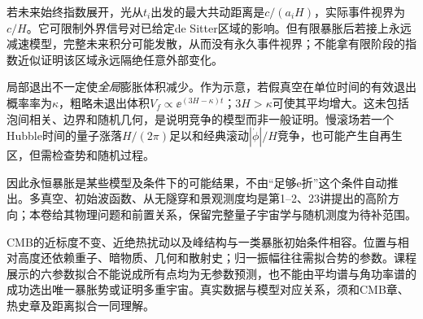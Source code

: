 若未来始终指数展开，光从$t_i$出发的最大共动距离是$c/(a_iH)$，实际事件视界为$c/H$。它可限制外界信号对已给定de Sitter区域的影响。但有限暴胀后若接上永远减速模型，完整未来积分可能发散，从而没有永久事件视界；不能拿有限阶段的指数近似证明该区域永远隔绝任意外部变化。

局部退出不一定使\emph{全局}膨胀体积减少。作为示意，若假真空在单位时间的有效退出概率率为$\kappa$，粗略未退出体积$V_f\propto\ee^{(3H-\kappa)t}$；$3H>\kappa$可使其平均增大。这未包括泡间相关、边界和随机几何，是说明竞争的模型而非一般证明。慢滚场若一个Hubble时间的量子涨落$H/(2\pi)$足以和经典滚动$|\dot\phi|/H$竞争，也可能产生自再生区，但需检查势和随机过程。

因此永恒暴胀是某些模型及条件下的可能结果，不由“足够e折”这个条件自动推出。多真空、初始波函数、从无隧穿和景观测度均是第1--2、23讲提出的高阶方向；本卷给其物理问题和前置关系，保留完整量子宇宙学与随机测度为待补范围。

CMB的近标度不变、近绝热扰动以及峰结构与一类暴胀初始条件相容。位置与相对高度还依赖重子、暗物质、几何和散射史；归一振幅往往需拟合势的参数。课程展示的六参数拟合不能说成所有点均为无参数预测，也不能由平均谱与角功率谱的成功选出唯一暴胀势或证明多重宇宙。真实数据与模型对应关系，须和CMB章、热史章及距离拟合一同理解。
